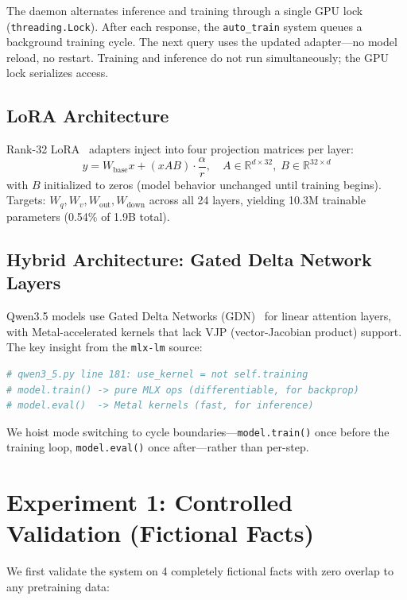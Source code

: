 \documentclass[11pt,a4paper]{article}
\begin{document}
The daemon alternates inference and training through a single GPU lock (\texttt{threading.Lock}). After each response, the \texttt{auto\_train} system queues a background training cycle. The next query uses the updated adapter---no model reload, no restart. Training and inference do not run simultaneously; the GPU lock serializes access.

\subsection{LoRA Architecture}

Rank-32 LoRA~\cite{hu2021lora} adapters inject into four projection matrices per layer:
\begin{equation}
    y = W_{\text{base}} x + (x A B) \cdot \frac{\alpha}{r}, \quad A \in \mathbb{R}^{d \times 32}, \; B \in \mathbb{R}^{32 \times d}
\end{equation}
with $B$ initialized to zeros (model behavior unchanged until training begins). Targets: $W_q, W_v, W_{\text{out}}, W_{\text{down}}$ across all 24 layers, yielding 10.3M trainable parameters (0.54\% of 1.9B total).

\subsection{Hybrid Architecture: Gated Delta Network Layers}
\label{sec:hybrid}

Qwen3.5 models use Gated Delta Networks (GDN)~\cite{yang2024gated} for linear attention layers, with Metal-accelerated kernels that lack VJP (vector-Jacobian product) support. The key insight from the \texttt{mlx-lm} source:

\begin{lstlisting}[language=Python, numbers=none]
# qwen3_5.py line 181: use_kernel = not self.training
# model.train() -> pure MLX ops (differentiable, for backprop)
# model.eval()  -> Metal kernels (fast, for inference)
\end{lstlisting}

We hoist mode switching to cycle boundaries---\texttt{model.train()} once before the training loop, \texttt{model.eval()} once after---rather than per-step.

\section{Experiment 1: Controlled Validation (Fictional Facts)}

We first validate the system on 4 completely fictional facts with zero overlap to any pretraining data:
\end{document}

